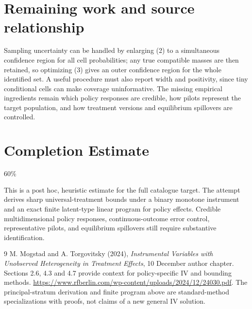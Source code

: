 \documentclass[11pt]{article}
\theoremstyle{definition}
\begin{document}
\section*{Remaining work and source relationship}
Sampling uncertainty can be handled by enlarging (2) to a simultaneous confidence
region for all cell probabilities; any true compatible masses are then retained,
so optimizing (3) gives an outer confidence region for the whole identified set.
A useful procedure must also report width and positivity, since tiny conditional
cells can make coverage uninformative. The missing empirical ingredients remain
which policy responses are credible, how pilots represent the target population,
and how treatment versions and equilibrium spillovers are controlled.

\section{Completion Estimate}
60\%

This is a post hoc, heuristic estimate for the full catalogue target.
The attempt derives sharp universal-treatment bounds under a binary monotone instrument and an exact finite latent-type linear program for policy effects. Credible multidimensional policy responses, continuous-outcome error control, representative pilots, and equilibrium spillovers still require substantive identification.

\begin{thebibliography}{9}
 M. Mogstad and A. Torgovitsky (2024),
\emph{Instrumental Variables with Unobserved Heterogeneity in Treatment Effects},
10 December author chapter. Sections 2.6, 4.3 and 4.7 provide context for
policy-specific IV and bounding methods.
\url{https://www.rfberlin.com/wp-content/uploads/2024/12/24030.pdf}.
The principal-stratum derivation and finite program above are standard-method
specializations with proofs, not claims of a new general IV solution.
\end{thebibliography}
\end{document}
